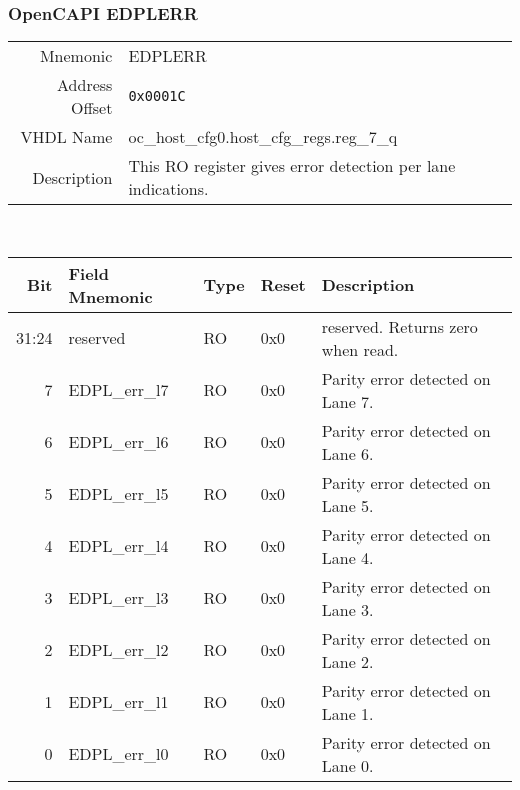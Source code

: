 \subsubsection{OpenCAPI EDPLERR}
\begin{tabular}{ r | p{350px} }
  Mnemonic       & EDPLERR          \\
  Address Offset & \texttt{0x0001C}                         \\
  VHDL Name      & oc\_host\_cfg0.host\_cfg\_regs.reg\_7\_q \\ \hline

  Description &
  This RO register gives error detection per lane indications. \\

\end{tabular}
\\
\begin{tabularx}{\textwidth}{r|l|l|l|X}
  \hline
  Bit   & Field Mnemonic    & Type & Reset      & Description \\ \hline

  31:24 & reserved  &  RO   & 0x0 & reserved. Returns zero when read. \\
  7     & EDPL\_err\_l7 &  RO   & 0x0 & Parity error detected on Lane 7. \\
  6     & EDPL\_err\_l6 &  RO   & 0x0 & Parity error detected on Lane 6. \\
  5     & EDPL\_err\_l5 &  RO   & 0x0 & Parity error detected on Lane 5. \\
  4     & EDPL\_err\_l4 &  RO   & 0x0 & Parity error detected on Lane 4. \\
  3     & EDPL\_err\_l3 &  RO   & 0x0 & Parity error detected on Lane 3. \\
  2     & EDPL\_err\_l2 &  RO   & 0x0 & Parity error detected on Lane 2. \\
  1     & EDPL\_err\_l1 &  RO   & 0x0 & Parity error detected on Lane 1. \\
  0     & EDPL\_err\_l0 &  RO   & 0x0 & Parity error detected on Lane 0. \\
\end{tabularx}

